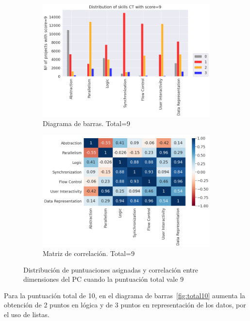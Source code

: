 \documentclass[a4paper, 12pt]{book}
\begin{document}
\begin{figure}[H]
    \centering
    \begin{subfigure}[h]{.49\textwidth} 
        \includegraphics[width=\textwidth]{img/distribucion_9_Scratch}
        \caption{Diagrama de barras. Total=9}
        \label{fig:total9}
    \end{subfigure}       
    \begin{subfigure}[h]{.49\textwidth} 
        \includegraphics[width=\textwidth]{img/corr_9_Scratch}
        \caption{Matriz de correlación. Total=9}
        \label{fig:corr9}
    \end{subfigure}
     \caption{Distribución de puntuaciones asignadas y correlación entre dimensiones del PC cuando la puntuación total vale 9}
\end{figure}

Para la puntuación total de 10, en el diagrama de barras~\ref{fig:total10} aumenta la obtención de 2 puntos en lógica y de 3 puntos en representación de los datos, por el uso de listas. 
\end{document}
